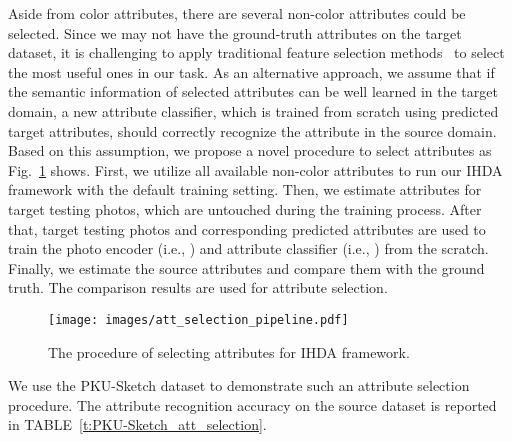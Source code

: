\documentclass[journal]{IEEEtran}
\begin{document}
   \tabcolsep=8pt
   \begin{table}[!ht]
   \centering
   \caption{Comparison of using color attributes on PKU-Sketch dataset.}
   \label{t:results_PKU-Sketch_color}
   \end{table}


Aside from color attributes, there are several non-color attributes could be selected. Since we may not have the ground-truth attributes on the target dataset, it is challenging to apply traditional feature selection methods~\cite{guyon2003introduction} to select the most useful ones in our task. As an alternative approach, we assume that if the semantic information of selected attributes can be well learned in the target domain, a new attribute classifier, which is trained from scratch using predicted target attributes, should correctly recognize the attribute in the source domain. Based on this assumption, we propose a novel procedure to select attributes as Fig.~\ref{fig:select_att} shows. First, we utilize all available non-color attributes to run our IHDA framework with the default training setting. Then, we estimate attributes for target testing photos, which are untouched during the training process. After that, target testing photos and corresponding predicted attributes are used to train the photo encoder (i.e., ) and attribute classifier (i.e., ) from the scratch. Finally, we estimate the source attributes and compare them with the ground truth. The comparison results are used for attribute selection.

\begin{figure}[!ht]
    \centering
    \texttt{[image: images/att\_selection\_pipeline.pdf]}
    \caption{The procedure of selecting attributes for IHDA framework.}
  \label{fig:select_att}
\end{figure}


We use the PKU-Sketch dataset to demonstrate such an attribute selection procedure. The attribute recognition accuracy on the source dataset is reported in TABLE~\ref{t:PKU-Sketch_att_selection}.
\end{document}
